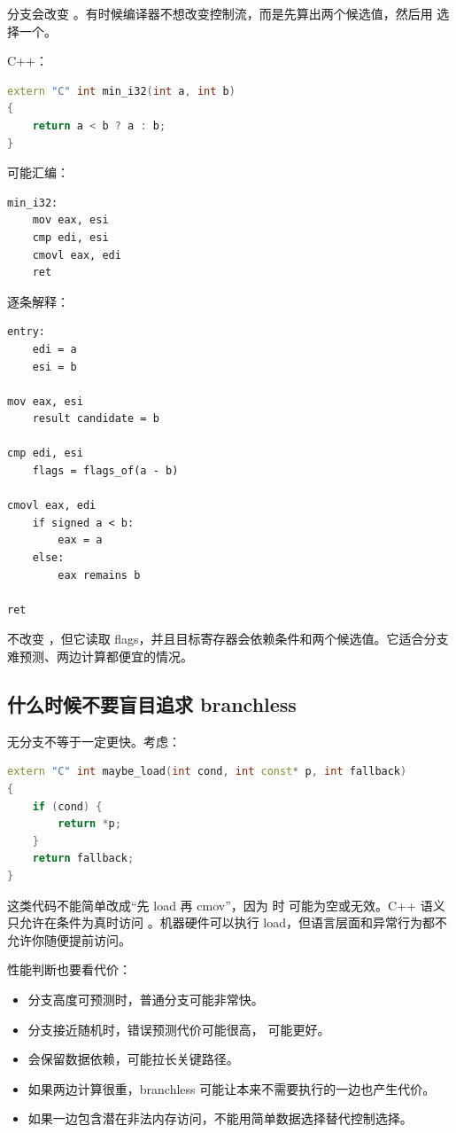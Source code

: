 分支会改变 。有时候编译器不想改变控制流，而是先算出两个候选值，然后用  选择一个。

C++：

\begin{lstlisting}[language=C++]
extern "C" int min_i32(int a, int b)
{
    return a < b ? a : b;
}
\end{lstlisting}

可能汇编：

\begin{lstlisting}
min_i32:
    mov eax, esi
    cmp edi, esi
    cmovl eax, edi
    ret
\end{lstlisting}

逐条解释：

\begin{lstlisting}
entry:
    edi = a
    esi = b

mov eax, esi
    result candidate = b

cmp edi, esi
    flags = flags_of(a - b)

cmovl eax, edi
    if signed a < b:
        eax = a
    else:
        eax remains b

ret
\end{lstlisting}

 不改变 ，但它读取 flags，并且目标寄存器会依赖条件和两个候选值。它适合分支难预测、两边计算都便宜的情况。

\subsection{什么时候不要盲目追求 branchless}

无分支不等于一定更快。考虑：

\begin{lstlisting}[language=C++]
extern "C" int maybe_load(int cond, int const* p, int fallback)
{
    if (cond) {
        return *p;
    }
    return fallback;
}
\end{lstlisting}

这类代码不能简单改成“先 load 再 cmov”，因为  时  可能为空或无效。C++ 语义只允许在条件为真时访问 。机器硬件可以执行 load，但语言层面和异常行为都不允许你随便提前访问。

性能判断也要看代价：

\begin{itemize}
  \item 分支高度可预测时，普通分支可能非常快。
  \item 分支接近随机时，错误预测代价可能很高， 可能更好。
  \item {} 会保留数据依赖，可能拉长关键路径。
  \item 如果两边计算很重，branchless 可能让本来不需要执行的一边也产生代价。
  \item 如果一边包含潜在非法内存访问，不能用简单数据选择替代控制选择。
\end{itemize}

